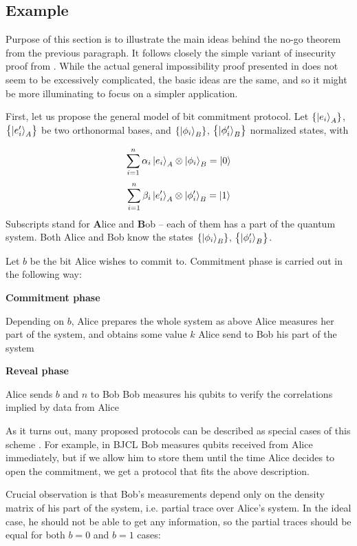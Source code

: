 \documentclass[10pt]{article}
\begin{document}
\subsection*{Example}

Purpose of this section is to illustrate the main ideas behind the no-go theorem from the previous
paragraph. It follows closely the simple variant of insecurity proof from \cite{Lo96}. While the actual
general impossibility proof presented in \cite{Mayers97} does not seem to be excessively complicated,
the basic ideas are the same, and so it might be more illuminating to focus on a simpler application.

First, let us propose the general model of bit commitment protocol. Let \(\left\{\Ket{e_i}_A\right\}\),
\(\left\{\Ket{e'_i}_A\right\}\) be two orthonormal bases, and \(\left\{\Ket{\phi_i}_B\right\}\),
\(\left\{\Ket{\phi'_i}_B\right\}\) normalized states, with

\[
\sum_{i=1}^n\alpha_i \Ket{e_i}_A\otimes \Ket{\phi_i}_B=\Ket{0}
\]
\[
\sum_{i=1}^n\beta_i \Ket{e'_i}_A\otimes \Ket{\phi'_i}_B=\Ket{1}
\]
Subscripts stand for \textbf{A}lice and \textbf{B}ob -- each of them has a part of the quantum system. 
Both Alice and Bob know the states \(\left\{\Ket{\phi_i}_B\right\}\), \(\left\{\Ket{\phi'_i}_B\right\}\).

Let \(b\) be the bit Alice wishes to commit to. Commitment phase is carried out in the following
way:

\NoCaptionOfAlgo
\begin{algorithm}[H]
\caption{\textbf{Commitment phase}}
Depending on \(b\), Alice prepares the whole system as above \;
Alice measures her part of the system, and obtains some value \(k\) \;
Alice send to Bob his part of the system \;
\end{algorithm}

\NoCaptionOfAlgo
\begin{algorithm}[H]
\caption{\textbf{Reveal phase}}
Alice sends \(b\) and \(n\) to Bob \;
Bob measures his qubits to verify the correlations implied by data from Alice \;
\end{algorithm}

As it turns out, many proposed protocols can be described as special cases of this scheme 
\cite{Lo96}. For example, in BJCL Bob measures qubits received from Alice immediately, but if we
allow him to store them until the time Alice decides to open the commitment, we get a protocol
that fits the above description.

Crucial observation is that Bob's measurements depend only on the density matrix of his part
of the system, i.e. partial trace over Alice's system. In the ideal case, he should not be able to
get any information, so the partial traces should be equal for both \(b=0\) and \(b=1\) cases:
\end{document}
